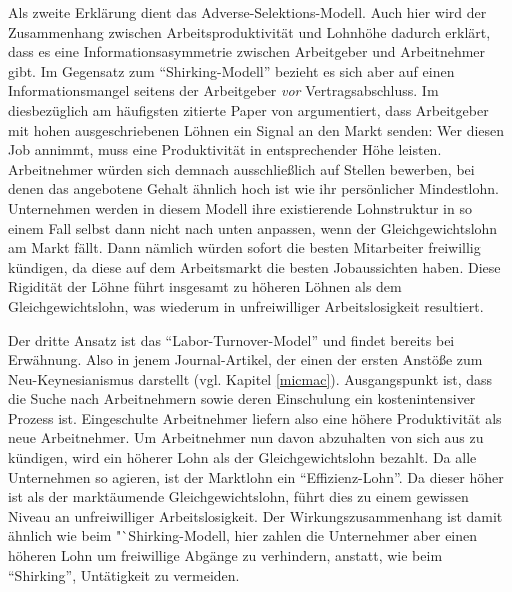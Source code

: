 Als zweite Erklärung dient das Adverse-Selektions-Modell. Auch hier wird der Zusammenhang zwischen Arbeitsproduktivität und Lohnhöhe dadurch erklärt, dass es eine Informationsasymmetrie zwischen Arbeitgeber und Arbeitnehmer gibt. Im Gegensatz zum "`Shirking-Modell"' bezieht es sich aber auf einen Informationsmangel seitens der Arbeitgeber \textit{vor} Vertragsabschluss. Im diesbezüglich am häufigsten zitierte Paper von \textcite{Weiss1980} argumentiert, dass Arbeitgeber mit hohen ausgeschriebenen Löhnen ein Signal an den Markt senden: Wer diesen Job annimmt, muss eine Produktivität in entsprechender Höhe leisten. Arbeitnehmer würden sich demnach ausschließlich auf Stellen bewerben, bei denen das angebotene Gehalt ähnlich hoch ist wie ihr persönlicher Mindestlohn. Unternehmen werden in diesem Modell ihre existierende Lohnstruktur in so einem Fall selbst dann nicht nach unten anpassen, wenn der Gleichgewichtslohn am Markt fällt. Dann nämlich würden sofort die besten Mitarbeiter freiwillig kündigen, da diese auf dem Arbeitsmarkt die besten Jobaussichten haben. Diese Rigidität der Löhne führt insgesamt zu höheren Löhnen als dem Gleichgewichtslohn, was wiederum in unfreiwilliger Arbeitslosigkeit resultiert.

Der dritte Ansatz ist das "`Labor-Turnover-Model"' und findet bereits bei \textcite{Phelps1968} Erwähnung. Also in jenem Journal-Artikel, der einen der ersten Anstöße zum Neu-Keynesianismus darstellt (vgl. Kapitel \ref{micmac}). Ausgangspunkt ist, dass die Suche nach Arbeitnehmern sowie deren Einschulung ein kostenintensiver Prozess ist. Eingeschulte Arbeitnehmer liefern also eine höhere Produktivität als neue Arbeitnehmer. Um Arbeitnehmer nun davon abzuhalten von sich aus zu kündigen, wird ein höherer Lohn als der Gleichgewichtslohn bezahlt. Da alle Unternehmen so agieren, ist der Marktlohn ein "`Effizienz-Lohn"'. Da dieser höher ist als der marktäumende Gleichgewichtslohn, führt dies zu einem gewissen Niveau an unfreiwilliger Arbeitslosigkeit.
Der Wirkungszusammenhang ist damit ähnlich wie beim "`Shirking-Modell, hier zahlen die Unternehmer aber einen höheren Lohn um freiwillige Abgänge zu verhindern, anstatt, wie beim "`Shirking"', Untätigkeit zu vermeiden.

